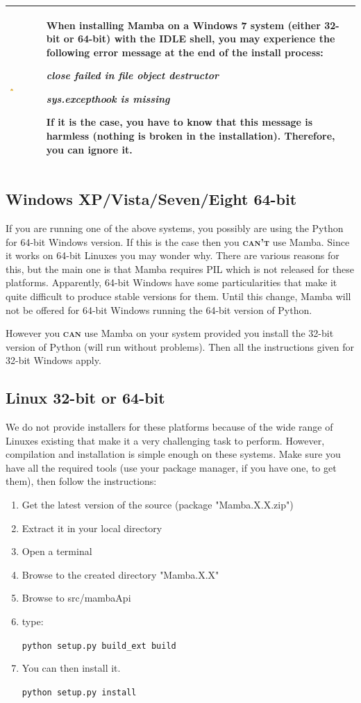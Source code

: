 \documentclass[a4paper,10pt,oneside]{article}
\newenvironment{warnBox}
{
    \begin{center}
    \begin{tabular}{ | b{0.1\textwidth} b{0.8\textwidth} | }
    \hline
    \rowcolor{yellow}
    \includegraphics[width=0.1\textwidth]{Crystal_Clear_app_error.png} &
}
{
    \\
    \hline
    \end{tabular}
    \end{center}
}
\begin{document}
\begin{warnBox}
When installing Mamba on a Windows 7 system (either 32-bit or 64-bit) with the 
IDLE shell, you may experience the following error message at the end of the 
install process:

\emph{close failed in file object destructor}

\emph{sys.excepthook is missing}

If it is the case, you have to know that this message is harmless (nothing is
broken in the installation). Therefore, you can ignore it.
\end{warnBox}

\subsection{Windows XP/Vista/Seven/Eight 64-bit}

If you are running one of the above systems, you possibly are using the Python for
64-bit Windows version. If this is the case then you \textsc{\textbf{can't}} use
Mamba. Since it works on 64-bit Linuxes you may wonder why. There are various reasons 
for this, but the main one is that Mamba requires PIL which is not released
for these platforms. Apparently, 64-bit Windows have some particularities that
make it quite difficult to produce stable versions for them. Until this change,
Mamba will not be offered for 64-bit Windows running the 64-bit version of
Python.

However you \textsc{\textbf{can}} use Mamba on your system provided you install
the 32-bit version of Python (will run without problems). Then all the 
instructions given for 32-bit Windows apply.

\subsection{Linux 32-bit or 64-bit}

We do not provide installers for these platforms because of the wide range of
Linuxes existing that make it a very challenging task to perform. However,
compilation and installation is simple enough on these systems. Make sure
you have all the required tools (use your package manager, if you have one, to 
get them), then follow the instructions:

\begin{enumerate}
\item Get the latest version of the source (package "Mamba.X.X.zip")
\item Extract it in your local directory
\item Open a terminal
\item Browse to the created directory "Mamba.X.X"
\item Browse to src/mambaApi
\item type:

\texttt{python setup.py build\_ext build}

\item You can then install it.

\texttt{python setup.py install}

\end{enumerate}
\end{document}
